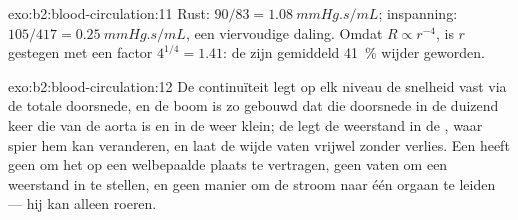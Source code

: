 \begin{solution}{exo:b2:blood-circulation:11}
Rust: $90/83 = \qty{1.08}{mmHg.s/mL}$; inspanning: $105/417 =
\qty{0.25}{mmHg.s/mL}$, een viervoudige daling. Omdat $R \propto r^{-4}$,
is $r$ gestegen met een factor $4^{1/4} = 1.41$: de  zijn
gemiddeld \qty{41}{\%} wijder geworden.
\end{solution}

\begin{solution}{exo:b2:blood-circulation:12}
De continuïteit legt op elk niveau de snelheid vast via de totale doorsnede,
en de boom is zo gebouwd dat die doorsnede in de  duizend keer die
van de aorta is en in de  weer klein; de  legt de
weerstand in de , waar spier hem kan veranderen, en laat de wijde
vaten vrijwel zonder verlies. Een  heeft geen  om
het  op een welbepaalde plaats te vertragen, geen vaten om een
weerstand in te stellen, en geen manier om de stroom naar één orgaan te
leiden --- hij kan alleen roeren.
\end{solution}

